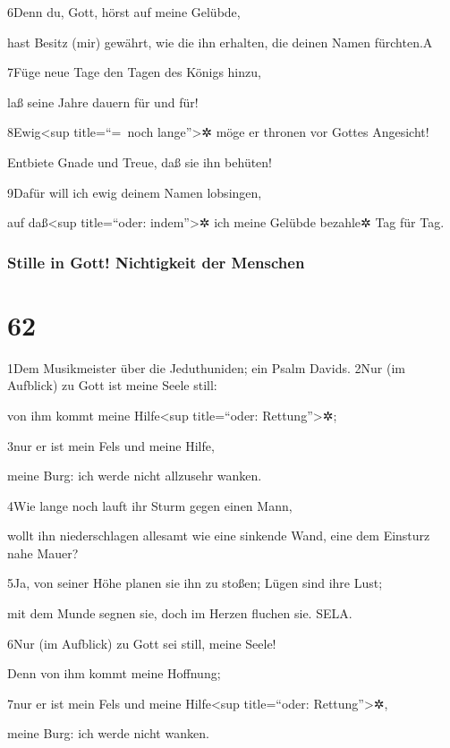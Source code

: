 6Denn du, Gott, hörst auf meine Gelübde,

hast Besitz (mir) gewährt, wie die ihn erhalten, die deinen Namen
fürchten.{A}

7Füge neue Tage den Tagen des Königs hinzu,

laß seine Jahre dauern für und für!

8Ewig\textless sup title=``=~noch lange''\textgreater✲ möge er thronen
vor Gottes Angesicht!

Entbiete Gnade und Treue, daß sie ihn behüten!

9Dafür will ich ewig deinem Namen lobsingen,

auf daß\textless sup title=``oder: indem''\textgreater✲ ich meine
Gelübde bezahle✲ Tag für Tag.

\hypertarget{stille-in-gott-nichtigkeit-der-menschen}{%
\subsubsection{Stille in Gott! Nichtigkeit der
Menschen}\label{stille-in-gott-nichtigkeit-der-menschen}}

\hypertarget{section-61}{%
\section{62}\label{section-61}}

1Dem Musikmeister über die Jeduthuniden; ein Psalm Davids. 2Nur (im
Aufblick) zu Gott ist meine Seele still:

von ihm kommt meine Hilfe\textless sup title=``oder:
Rettung''\textgreater✲;

3nur er ist mein Fels und meine Hilfe,

meine Burg: ich werde nicht allzusehr wanken.

4Wie lange noch lauft ihr Sturm gegen einen Mann,

wollt ihn niederschlagen allesamt wie eine sinkende Wand, eine dem
Einsturz nahe Mauer?

5Ja, von seiner Höhe planen sie ihn zu stoßen; Lügen sind ihre Lust;

mit dem Munde segnen sie, doch im Herzen fluchen sie. SELA.

6Nur (im Aufblick) zu Gott sei still, meine Seele!

Denn von ihm kommt meine Hoffnung;

7nur er ist mein Fels und meine Hilfe\textless sup title=``oder:
Rettung''\textgreater✲,

meine Burg: ich werde nicht wanken.


